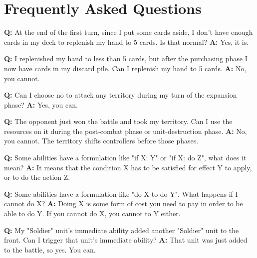 \documentclass[a4paper]{article}
\begin{document}
    
\newpage
\section{Frequently Asked Questions}

    \hspace{-2em}
    \textbf{Q:} At the end of the first turn, since I put some cards aside,
    I don't have enough cards in my deck to replenish my hand to 5 cards.
    Is that normal?
    \newline
    \textbf{A:} Yes, it is.

    \hspace{-2em}
    \textbf{Q:} I replenished my hand to less than 5 cards, but after the purchasing
    phase I now have cards in my discard pile. Can I replenish my hand to 5 cards.
    \newline
    \textbf{A:} No, you cannot.

    \hspace{-2em}
    \textbf{Q:} Can I choose no to attack any territory during my turn of the
    expansion phase?
    \newline
    \textbf{A:} Yes, you can.

    \hspace{-2em}
    \textbf{Q:} The opponent just won the battle and took my territory.
    Can I use the resources on it during the post-combat phase
    or unit-destruction phase.
    \newline
    \textbf{A:} No, you cannot. The territory shifts controllers before those phases.

    \hspace{-2em}
    \textbf{Q:} Some abilities have a formulation like "if X: Y" or "if X: do Z",
     what does it mean?
    \newline
    \textbf{A:} It means that the condition X has to be satisfied for effect Y to apply,
    or to do the action Z.

    \hspace{-2em}
    \textbf{Q:} Some abilities have a formulation like "do X to do Y".
    What happens if I cannot do X?
    \newline
    \textbf{A:} Doing X is some form of cost you need to pay in order to be able to
    do Y. If you cannot do X, you cannot to Y either.

    \hspace{-2em}
    \textbf{Q:} My "Soldier" unit's immediate ability added another "Soldier"
    unit to the front. Can I trigger that unit's immediate ability?
    \newline
    \textbf{A:} That unit was just added to the battle, so yes. You can.
\end{document}
